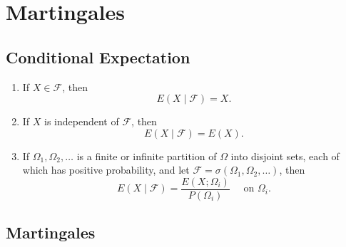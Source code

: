 \chapter{Martingales}

\section{Conditional Expectation}

\begin{definition}

\end{definition}

\begin{example}
    \begin{enumerate}
        \item If $X\in\mathcal{F}$, then
              \begin{equation*}
                  E\left(X\mid\mathcal{F}\right)=X.
              \end{equation*}
        \item If $X$ is independent of $\mathcal{F}$, then
              \begin{equation*}
                  E\left(X\mid\mathcal{F}\right)=E(X).
              \end{equation*}
        \item If $\Omega_{1}, \Omega_{2}, \ldots$ is a finite or infinite partition of $\Omega$ into disjoint sets, each of which has positive probability, and let $\mathcal{F}=\sigma\left(\Omega_{1},\Omega_{2},\ldots\right)$, then
              \begin{equation*}
                  E\left(X\mid\mathcal{F}\right)=\frac{E\left(X;\Omega_{i}\right)}{P\left(\Omega_{i}\right)}\quad\text { on }\Omega_{i}.
              \end{equation*}
    \end{enumerate}
\end{example}

\begin{property}

\end{property}

\section{Martingales}

